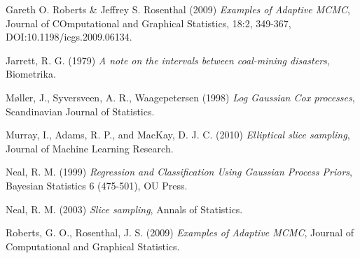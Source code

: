 \documentclass{article}
\begin{document}
\begin{thebibliography}{12}

  Gareth O. Roberts & Jeffrey S. Rosenthal (2009)
  \emph{Examples of Adaptive MCMC}, Journal of COmputational and Graphical Statistics, 18:2, 349-367, DOI:10.1198/icgs.2009.06134.

	Jarrett, R. G.  (1979)
	\emph{A note on the intervals between coal-mining disasters},
	Biometrika.

	M{\o}ller, J., Syversveen, A. R., Waagepetersen  (1998)
	\emph{Log Gaussian Cox processes},
	Scandinavian Journal of Statistics.

	Murray, I., Adams, R. P., and MacKay, D. J. C. (2010)
	\emph{Elliptical slice sampling},
	Journal of Machine Learning Research.

	Neal, R. M. (1999)
	\emph{Regression and Classification Using
Gaussian Process Priors},
	Bayesian Statistics 6 (475-501), OU Press.

	Neal, R. M. (2003)
	\emph{Slice sampling},
	Annals of Statistics.

	Roberts, G. O., Rosenthal, J. S. (2009)
	\emph{Examples of Adaptive MCMC},
	Journal of Computational and Graphical Statistics.



\end{thebibliography}
\end{document}
